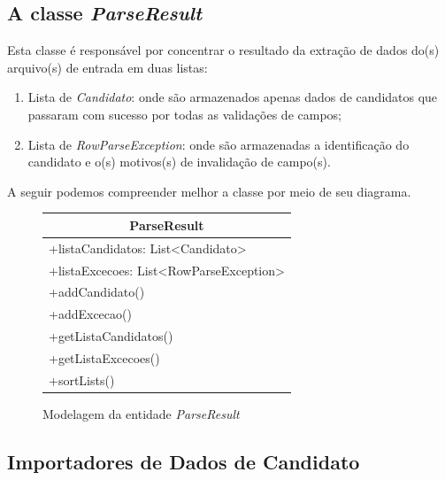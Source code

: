 \documentclass[
	12pt,			%
	openright,		%
	oneside,	
	a4paper,		%
	english,		%
	brazil			%
]{abntex2/abntex2}  %
\begin{document}
	\subsection{A classe \textit{ParseResult}} \label{cap-parse-result}
	
	Esta classe é responsável por concentrar o resultado da extração de dados do(s) arquivo(s) de entrada em duas listas:
		
	\begin{enumerate}
			
		\item Lista de \textit{Candidato}: onde são armazenados apenas dados de candidatos que passaram com sucesso por todas as validações de campos;
		\item Lista de \textit{RowParseException}: onde são armazenadas a identificação do candidato e o(s) motivos(s) de invalidação de campo(s).
			
	\end{enumerate}
	
	A seguir podemos compreender melhor a classe por meio de seu diagrama.
	
	\begin{figure}[H]
		\begin{center}
			
			\caption{Modelagem da entidade \textit{ParseResult}}
			\label{parseresult-uml}
			
			\begin{tabular}{|l|}
				\hline
				\multicolumn{1}{|c|}{\textbf{ParseResult}} \\ \hline
				+listaCandidatos: List\textless{}Candidato\textgreater{} \\
				+listaExcecoes: List\textless{}RowParseException\textgreater{} \\ \hline
				+addCandidato() \\
				+addExcecao() \\
				+getListaCandidatos() \\
				+getListaExcecoes() \\
				+sortLists() \\ \hline
			\end{tabular}
			
		\end{center}
	\end{figure}
	
	\subsection{Importadores de Dados de Candidato}
	
\end{document}
